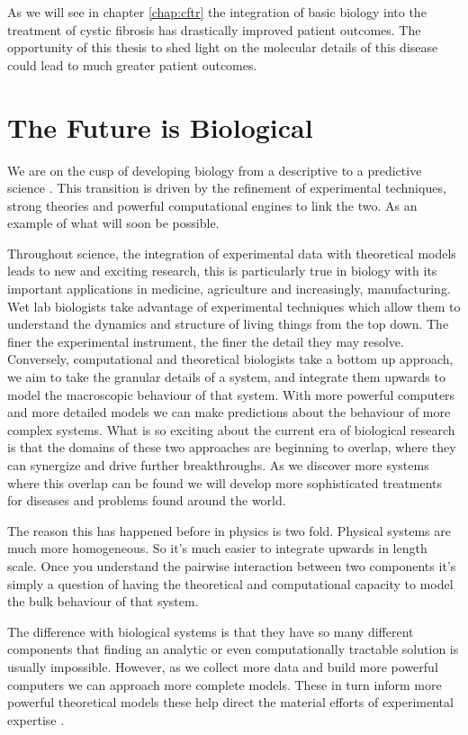 As we will see in chapter \ref{chap:cftr} the integration of basic biology into the treatment of cystic fibrosis has drastically improved patient outcomes. The opportunity of this thesis to shed light on the molecular details of this disease could lead to much greater patient outcomes. 

\section{The Future is Biological}
We are on the cusp of developing biology from a descriptive to a predictive science \cite{kochanski1973,liu2005, mogilner2016, covert2021, jumper2021}. This transition is driven by the refinement of experimental techniques, strong theories and powerful computational engines to link the two. As an example of what will soon be possible.

Throughout science, the integration of experimental data with theoretical models leads to new and exciting research, this is particularly true in biology with its important applications in medicine, agriculture and increasingly, manufacturing. Wet lab biologists take advantage of experimental techniques which allow them to understand the dynamics and structure of living things from the top down. The finer the experimental instrument, the finer the detail they may resolve. Conversely, computational and theoretical biologists take a bottom up approach, we aim to take the granular details of a system, and integrate them upwards to model the macroscopic behaviour of that system. With more powerful computers and more detailed models we can make predictions about the behaviour of more complex systems. What is so exciting about the current era of biological research is that the domains of these two approaches are beginning to overlap, where they can synergize  and drive further breakthroughs. As we discover more systems where this overlap can be found we will develop more sophisticated treatments for diseases and problems found around the world.

The reason this has happened before in physics is two fold. Physical systems are much more homogeneous. So it's much easier to integrate upwards in length scale. Once you understand the pairwise interaction between two components it's simply a question of having the theoretical and computational capacity to model the bulk behaviour of that system. 

The difference with biological systems is that they have so many different components that finding an analytic or even computationally tractable solution is usually impossible. However, as we collect more data and build more powerful computers we can approach more complete models. These in turn inform more powerful theoretical models these help direct the material efforts of experimental expertise . 

